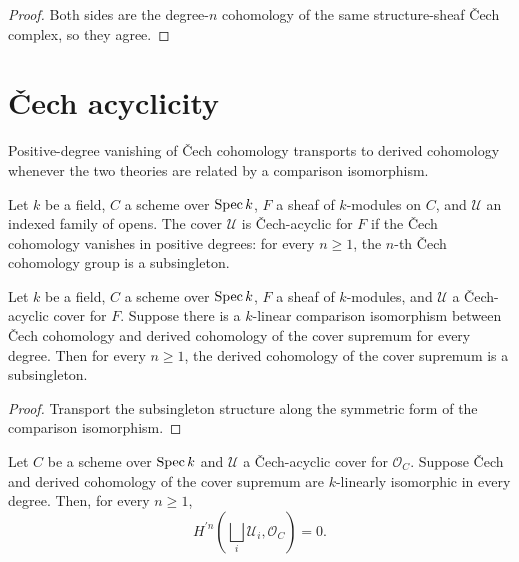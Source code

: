 \begin{proof}
  \leanok
  Both sides are the degree-\(n\) cohomology of the same structure-sheaf \v{C}ech complex, so they agree.
\end{proof}

\section{\v{C}ech acyclicity}
\label{mk-sec:moduleK_cech_acyclic_cover}

Positive-degree vanishing of \v{C}ech cohomology transports to derived cohomology whenever the two theories are related by a comparison isomorphism.

\begin{definition}\label{mk-def:Scheme_IsCechAcyclicCover}
  \leanok


  Let \(k\) be a field, \(C\) a scheme over \(\operatorname{Spec} k\), \(F\) a sheaf of \(k\)-modules on \(C\), and \(\mathcal U\) an indexed family of opens. The cover \(\mathcal U\) is \v{C}ech-acyclic for \(F\) if the \v{C}ech cohomology vanishes in positive degrees: for every \(n \ge 1\), the \(n\)-th \v{C}ech cohomology group is a subsingleton.
\end{definition}

\begin{theorem}\label{mk-thm:Scheme_subsingleton_HModule_prime_supr_of_isCechAcyclicCover}
  \leanok


  Let \(k\) be a field, \(C\) a scheme over \(\operatorname{Spec} k\), \(F\) a sheaf of \(k\)-modules, and \(\mathcal U\) a \v{C}ech-acyclic cover for \(F\). Suppose there is a \(k\)-linear comparison isomorphism between \v{C}ech cohomology and derived cohomology of the cover supremum for every degree. Then for every \(n \ge 1\), the derived cohomology of the cover supremum is a subsingleton.
\end{theorem}

\begin{proof}
  \leanok

  Transport the subsingleton structure along the symmetric form of the comparison isomorphism.
\end{proof}

\begin{theorem}\label{mk-thm:Scheme_subsingleton_HModule_prime_supr_of_isCechAcyclicCover_curve}
  \leanok


  Let \(C\) be a scheme over \(\operatorname{Spec} k\) and \(\mathcal U\) a \v{C}ech-acyclic cover for \(\mathcal O_C\). Suppose \v{C}ech and derived cohomology of the cover supremum are \(k\)-linearly isomorphic in every degree. Then, for every \(n\geq 1\),
  \[
    H^{\prime n}\!\left(\bigsqcup_i \mathcal U_i,\mathcal O_C\right)=0.
  \]
\end{theorem}

